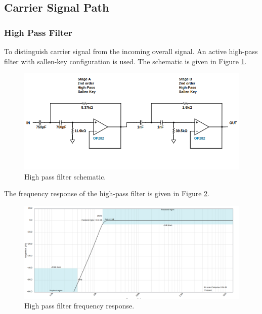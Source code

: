 \documentclass[a4paper,10pt]{IEEEtran}
\begin{document}
\subsection{Carrier Signal Path}
\subsubsection{High Pass Filter}
To distinguish carrier signal from the  incoming overall signal. An active high-pass filter with sallen-key configuration  is used. The schematic is given in Figure \ref{highpass}.
\begin{figure}[htbp!]
    \centering
    \includegraphics[width = 1\linewidth]{active_high_pass_circuit.png}
    \caption{High pass filter schematic. }
    \label{highpass}
\end{figure} 
The frequency response of the high-pass filter is given in Figure \ref{highpass_resp}.
\begin{figure}[htbp!]
    \centering
    \includegraphics[width = 1\linewidth]{active_high_pass.png}
    \caption{High pass filter frequency response.}
    \label{highpass_resp}
\end{figure} 
\end{document}

